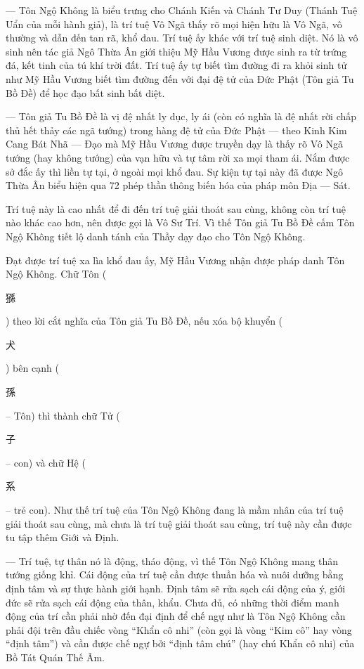 — Tôn Ngộ Không là biểu trưng cho Chánh Kiến và Chánh Tư Duy (Thánh Tuệ Uẩn của mỗi hành giả), là trí tuệ Vô Ngã thấy rõ mọi hiện hữu là Vô Ngã, vô thường và dẫn đến tan rã, khổ đau. Trí tuệ ấy khác với trí tuệ sinh diệt. Nó là vô sinh nên tác giả Ngô Thừa Ân giới thiệu Mỹ Hầu Vương được sinh ra từ trứng đá, kết tinh của tú khí trời đất. Trí tuệ ấy tự biết tìm đường đi ra khỏi sinh tử như Mỹ Hầu Vương biết tìm đường đến với đại đệ tử của Đức Phật (Tôn giả Tu Bồ Đề) để học đạo bất sinh bất diệt.

— Tôn giả Tu Bồ Đề là vị đệ nhất ly dục, ly ái (còn có nghĩa là đệ nhất rời chấp thủ hết thảy các ngã tướng) trong hàng đệ tử của Đức Phật — theo Kinh Kim Cang Bát Nhã — Đạo mà Mỹ Hầu Vương được truyền dạy là thấy rõ Vô Ngã tướng (hay không tướng) của vạn hữu và tự tâm rời xa mọi tham ái. Nắm được sở đắc ấy thì liền tự tại, ở ngoài mọi khổ đau. Sự kiện tự tại này đã được Ngô Thừa Ân biểu hiện qua 72 phép thần thông biến hóa của pháp môn Địa — Sát.

Trí tuệ này là cao nhất để đi đến trí tuệ giải thoát sau cùng, không còn trí tuệ nào khác cao hơn, nên được gọi là Vô Sư Trí. Vì thế Tôn giả Tu Bồ Đề cấm Tôn Ngộ Không tiết lộ danh tánh của Thầy dạy đạo cho Tôn Ngộ Không.

Đạt được trí tuệ xa lìa khổ đau ấy, Mỹ Hầu Vương nhận được pháp danh Tôn Ngộ Không. Chữ Tôn (\begin{CJK*}{UTF8}{bkai}猻\end{CJK*}) theo lời cắt nghĩa của Tôn giả Tu Bồ Đề, nếu xóa bộ khuyển (\begin{CJK*}{UTF8}{bkai}犬\end{CJK*}) bên cạnh (\begin{CJK*}{UTF8}{bkai}孫\end{CJK*} -- Tôn) thì thành chữ Tử (\begin{CJK*}{UTF8}{bkai}子\end{CJK*} -- con) và chữ Hệ (\begin{CJK*}{UTF8}{bkai}系\end{CJK*} -- trẻ con). Như thế trí tuệ của Tôn Ngộ Không đang là mầm nhân của trí tuệ giải thoát sau cùng, mà chưa là trí tuệ giải thoát sau cùng, trí tuệ này cần được tu tập thêm Giới và Định.

— Trí tuệ, tự thân nó là động, tháo động, vì thế Tôn Ngộ Không mang thân tướng giống khỉ. Cái động của trí tuệ cần được thuần hóa và nuôi dưỡng bằng định tâm và sự thực hành giới hạnh. Định tâm sẽ rửa sạch cái động của ý, giới đức sẽ rửa sạch cái động của thân, khẩu. Chưa đủ, có những thời điểm manh động của trí cần phải nhờ đến đại định để chế ngự như là Tôn Ngộ Không cần phải đội trên đầu chiếc vòng ``Khẩn cô nhi'' (còn gọi là vòng ``Kim cô'' hay vòng ``định tâm'') và cần được chế ngự bởi ``định tâm chú'' (hay chú Khẩn cô nhi) của Bồ Tát Quán Thế Âm.

